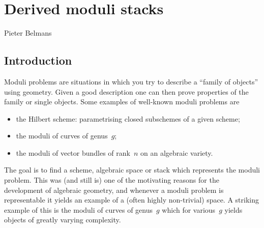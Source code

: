 \chapter{Derived moduli stacks}
\begin{flushright}
  Pieter Belmans
\end{flushright}

\begin{refsection}

\section{Introduction}
Moduli problems are situations in which you try to describe a ``family of objects'' using geometry. Given a good description one can then prove properties of the family or single objects. Some examples of well-known moduli problems are
\begin{itemize}
  \item the Hilbert scheme: parametrising closed subschemes of a given scheme;
  \item the moduli of curves of genus~$g$;
  \item the moduli of vector bundles of rank~$n$ on an algebraic variety.
\end{itemize}
The goal is to find a scheme, algebraic space or stack which represents the moduli problem. This was (and still is) one of the motivating reasons for the development of algebraic geometry, and whenever a moduli problem is representable it yields an example of a (often highly non-trivial) space. A striking example of this is the moduli of curves of genus~$g$ which for various~$g$ yields objects of greatly varying complexity.


\end{refsection}
